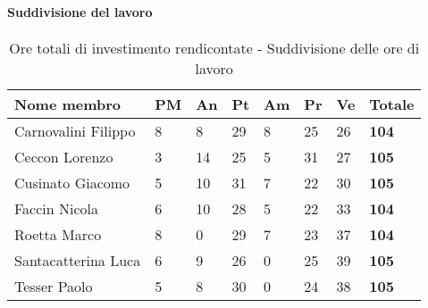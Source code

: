 			\paragraph{Suddivisione del lavoro} %
			\label{par:suddivisione_del_lavoro}
				\begin{table}[!h]
					\begin{center}
						\begin{tabularx}{0.9\textwidth}{|l|l|l|l|l|l|l|X|}
							\hline
							\textbf{Nome membro} & \textbf{PM} & \textbf{An} & \textbf{Pt} & \textbf{Am} & \textbf{Pr} & \textbf{Ve} & \textbf{Totale} \\
							\hline
							Carnovalini Filippo & 8 & 8 & 29 & 8 & 25 & 26 & \textbf{104} \\
							\hline
							Ceccon Lorenzo & 3 & 14 & 25 & 5 & 31 & 27 & \textbf{105} \\
							\hline
							Cusinato Giacomo & 5 & 10 & 31 & 7 & 22 & 30 & \textbf{105} \\
							\hline
							Faccin Nicola & 6 & 10 & 28 & 5 & 22 & 33 & \textbf{104} \\
							\hline
							Roetta Marco & 8 & 0 & 29 & 7 & 23 & 37 & \textbf{104} \\
							\hline
							Santacatterina Luca & 6 & 9 & 26 & 0 & 25 & 39 & \textbf{105} \\
							\hline
							Tesser Paolo & 5 & 8 & 30 & 0 & 24 & 38 & \textbf{105} \\
							\hline	
						\end{tabularx}
					\end{center}
				\caption{Ore totali di investimento rendicontate - Suddivisione delle ore di lavoro}
				\end{table}
			

